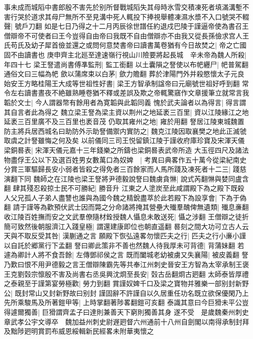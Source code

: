 事未成而城䧟中書郎殷不害先於别所督戰城䧟失其母時氷雪交積凍死者填滿溝塹不害行哭於道求其母尸無所不至見溝中死人輒投下捧視舉體凍濕水漿不入口號哭不輟聲|{
	號戶刀翻}
如是七日乃得之十二月丙辰徐世譜任約退戍巴陵于謹逼帝使為書召王僧辯帝不可使者曰王今豈得自由帝曰我既不自由僧辯亦不由我又從長孫儉求宫人王氏苟氏及幼子犀首儉並還之或問何意焚書帝曰讀書萬卷猶有今日故焚之|{
	帝之亡國固不由讀書也}
庚申齊主北廵至達速嶺行視山川險要將起長城　辛未帝為魏人所殺|{
	年四十七}
梁王詧遣尚書傅凖監刑|{
	監工銜翻}
以土囊隕之詧使以布帊纒尸|{
	帊普駕翻通俗文曰三幅為帊}
歛以蒲席束以白茅|{
	歛力贍翻}
葬於津陽門外并殺愍懷太子元良始安王方略桂陽王大成等世祖性好書|{
	梁王方智承制諡帝曰元廟號世祖好呼到翻}
常令左右讀書晝夜不絶雖熟睡卷猶不釋或差誤及欺之帝輒驚窹作文章援筆立就常言我韜於文士|{
	今人謂器幣有餘用者為寛韜與此韜同義}
愧於武夫論者以為得言|{
	得言謂其自言者此為得之}
魏立梁王詧為梁主資以荆州之地延袤三百里|{
	資以江陵緣江之地延袤三百里廣不及三百里也袤音茂}
仍取其雍州之地|{
	雍於用翻}
詧居江陵東城魏置防主將兵居西城名曰助防外示助詧備禦内實防之|{
	魏克江陵因取襄樊之地此正滅虢取虞之計詧雖悔之何及矣}
以前儀同三司王悦留鎮江陵于謹收府庫珍寶及宋渾天儀梁銅晷表|{
	宋渾天儀元嘉十三年錢樂之所鑄也梁銅晷表武帝所造}
大玉徑四尺及諸法物盡俘王公以下及選百姓男女數萬口為奴婢　|{
	考異曰典畧作五十萬今從梁紀南史}
分賞三軍驅歸長安小弱者皆殺之得免者三百餘家而人馬所踐及凍死者十二三|{
	踐慈演翻下同}
魏師之在江陵也梁王詧將尹德毅說詧曰魏虜貪惏|{
	說式芮翻惏與婪同盧含翻}
肆其殘忍殺掠士民不可勝紀|{
	勝音升}
江東之人塗炭至此咸謂殿下為之殿下既殺人父兄孤人子弟人盡讐也誰與為國今魏之精銳盡萃於此若殿下為設享會|{
	下為于偽翻}
請于謹等為歡預伏武士因而斃之分命諸將掩其營壘大殱羣醜俾無遺類|{
	殱息亷翻}
收江陵百姓撫而安之文武羣僚隨材銓授魏人懾息未敢送死|{
	懾之涉翻}
王僧辯之徒折簡可致然後朝服濟江入踐皇極|{
	謂還建康即位也朝直遥翻}
晷刻之間大功可立古人云天與不取反受其咎|{
	漢蒯通之言}
願殿下恢弘遠畧勿懷匹夫之行|{
	匹夫之行小亷小謹以自託於郷黨行下孟翻}
詧曰卿此策非不善也然魏人待我厚未可背德|{
	背蒲妹翻}
若遽為卿計人將不食吾餘|{
	左傳鄧祁侯之言}
既而闔城老幼被虜又失襄陽|{
	被皮義翻}
詧乃歎曰恨不用尹德毅之言王僧辯陳霸先等共奉江州刺史晉安王方智為太宰承制王褒王克劉㲄宗懔殷不害及尚書右丞吳興沈烱至長安|{
	㲄古岳翻烱古㢠翻}
太師泰皆厚禮之泰親至于謹第宴勞極歡|{
	勞力到翻}
賞謹奴婢千口及梁之寶物并雅樂一部别封新野公|{
	既封常山又封新野故曰别封}
謹固辭不許謹自以久居重任功名既立欲保優閑乃上先所乘駿馬及所著鎧甲等|{
	上時掌翻著陟畧翻鎧可亥翻}
泰識其意曰今巨猾未平公豈得遽爾獨善|{
	巨猾謂齊孟子曰達則兼善天下窮則獨善其身}
遂不受　是歲魏秦州刺史章武孝公宇文導卒　魏加益州刺史尉遟㢠督六州通前十八州自劍閣以南得承制封拜及黜陟㢠明賞罰布威恩綏輯新民經畧未附華夷懷之

